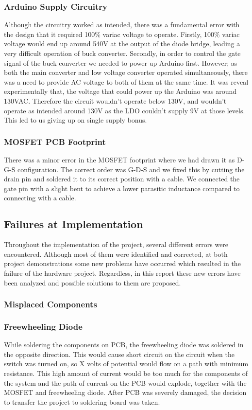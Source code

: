 \documentclass[12pt]{article}
\begin{document}
\subsubsection{Arduino Supply Circuitry}
Although the circuitry worked as intended, there was a fundamental error with the design that it required 100\% variac voltage to operate. Firstly, 100\% variac voltage would end up around 540V at the output of the diode bridge, leading a very difficult operation of buck converter. Secondly, in order to control the gate signal of the buck converter we needed to power up Arduino first. However; as both the main converter and low voltage converter operated simultaneously, there was a need to provide AC voltage to both of them at the same time. It was reveal experimentally that, the voltage that could power up the Arduino was around 130VAC. Therefore the circuit wouldn't operate below 130V, and wouldn't operate as intended around 130V as the LDO couldn't supply 9V at those levels. This led to us giving up on single supply bonus.
\subsubsection{MOSFET PCB Footprint}
There was a minor error in the MOSFET footprint where we had drawn it as D-G-S configuration. The correct order was G-D-S and we fixed this by cutting the drain pin and soldered it to its correct position with a cable. We connected the gate pin with a slight bent to achieve a lower parasitic inductance compared to connecting with a cable.
\subsection{Failures at Implementation}
Throughout the implementation of the project, several different errors were encountered. Although most of them were identified and corrected, at both project demonstrations some new problems have occurred which resulted in the failure of the hardware project. Regardless, in this report these new errors have been analyzed and possible solutions to them are proposed.
\subsubsection{Misplaced Components}
\subsubsection*{Freewheeling Diode}
While soldering the components on PCB, the freewheeling diode was soldered in the opposite direction. This would cause short circuit on the circuit when the switch was turned on, so X volts of potential would flow on a path with minimum resistance. This high amount of current would be too much for the components of the system and the path of current on the PCB would explode, together with the MOSFET and freewheeling diode. After PCB was severely damaged, the decision to transfer the project to soldering board was taken.
\end{document}
